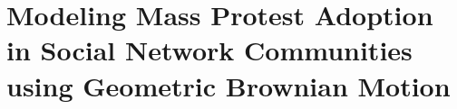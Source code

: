 
\chapter{Modeling Mass Protest Adoption in Social Network Communities using Geometric Brownian Motion}

\begingroup
\newcommand{\score}{S}
\newcommand{\myalgo}{CoolAlgo}








\endgroup
